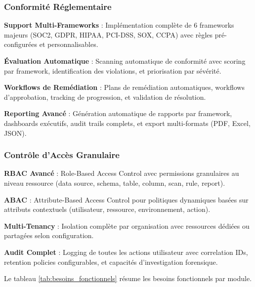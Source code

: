 \subsubsection{Conformité Réglementaire}

\textbf{Support Multi-Frameworks} : Implémentation complète de 6 frameworks majeurs (SOC2, GDPR, HIPAA, PCI-DSS, SOX, CCPA) avec règles pré-configurées et personnalisables.

\textbf{Évaluation Automatique} : Scanning automatique de conformité avec scoring par framework, identification des violations, et priorisation par sévérité.

\textbf{Workflows de Remédiation} : Plans de remédiation automatiques, workflows d'approbation, tracking de progression, et validation de résolution.

\textbf{Reporting Avancé} : Génération automatique de rapports par framework, dashboards exécutifs, audit trails complets, et export multi-formats (PDF, Excel, JSON).

\subsubsection{Contrôle d'Accès Granulaire}

\textbf{RBAC Avancé} : Role-Based Access Control avec permissions granulaires au niveau ressource (data source, schema, table, column, scan, rule, report).

\textbf{ABAC} : Attribute-Based Access Control pour politiques dynamiques basées sur attributs contextuels (utilisateur, ressource, environnement, action).

\textbf{Multi-Tenancy} : Isolation complète par organisation avec ressources dédiées ou partagées selon configuration.

\textbf{Audit Complet} : Logging de toutes les actions utilisateur avec correlation IDs, retention policies configurables, et capacités d'investigation forensique.

Le tableau \ref{tab:besoins_fonctionnels} résume les besoins fonctionnels par module.

